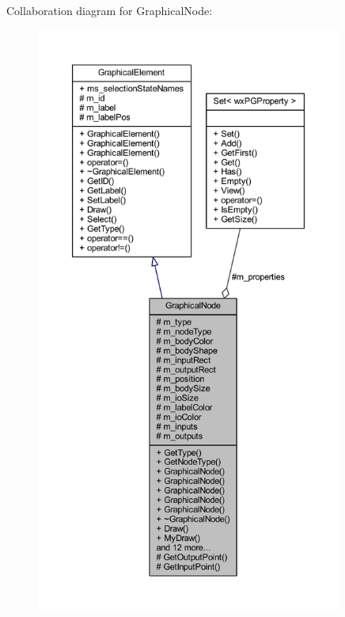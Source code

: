 Collaboration diagram for Graphical\+Node\+:
\nopagebreak
\begin{figure}[H]
\begin{center}
\leavevmode
\includegraphics[height=550pt]{class_graphical_node__coll__graph}
\end{center}
\end{figure}

